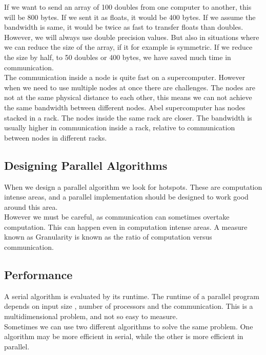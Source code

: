 If we want to send an array of 100 doubles from one computer to another, this will be 800 bytes. If we sent it as floats, it would be 400 bytes. If we assume the bandwidth is same, it would be twice as fast to transfer floats than doubles. \\

However, we will always use double precision values. But also in situations where we can reduce the size of the array, if it for example is symmetric. If we reduce the size by half, to 50 doubles or 400 bytes, we have saved much time in communication. \\

The communication inside a node is quite fast on a supercomputer. However when we need to use multiple nodes at once there are challenges. The nodes are not at the same physical distance to each other, this means we can not achieve the same bandwidth between different nodes. Abel supercomputer has nodes stacked in a rack. The nodes inside the same rack are closer. The bandwidth is usually higher in communication inside a rack, relative to communication between nodes in different racks. 

\subsection{Designing Parallel Algorithms}
When we design a parallel algorithm we look for hotspots. These are computation intense areas, and a parallel implementation should be designed to work good around this area. \\

However we must be careful, as communication can sometimes overtake computation. This can happen even in computation intense areas. A measure known as Granularity is known as the ratio of computation versus communication.

\subsection{Performance}
A serial algorithm is evaluated by its runtime. The runtime of a parallel program depends on input size , number of processors and the communication. This is a multidimensional problem, and not so easy to measure. \\

Sometimes we can use two different algorithms to solve the same problem. One algorithm may be more efficient in serial, while the other is more efficient in parallel. \\

